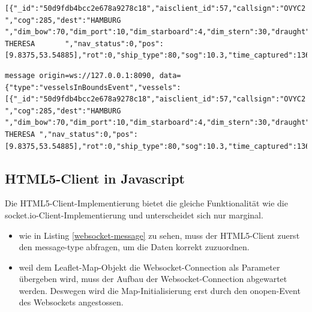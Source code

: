 \begin{lstlisting}[caption= vom socket.io-Server gesendete message, label=socket.io-message]
[{"_id":"50d9fdb4bcc2e678a9278c18","aisclient_id":57,"callsign":"OVYC2  ","cog":285,"dest":"HAMBURG             ","dim_bow":70,"dim_port":10,"dim_starboard":4,"dim_stern":30,"draught":54,"imo":"9363170","mmsi":220515000,"msgid":1,"name":"RIKKE THERESA       ","nav_status":0,"pos":[9.8375,53.54885],"rot":0,"ship_type":80,"sog":10.3,"time_captured":1366734056000,"time_received":1366733855248,"true_heading":286}]
\end{lstlisting}

\begin{lstlisting}[caption= vom Websocket-Server gesendete message, label=websocket-message]
message origin=ws://127.0.0.1:8090, data={"type":"vesselsInBoundsEvent","vessels":[{"_id":"50d9fdb4bcc2e678a9278c18","aisclient_id":57,"callsign":"OVYC2 ","cog":285,"dest":"HAMBURG ","dim_bow":70,"dim_port":10,"dim_starboard":4,"dim_stern":30,"draught":54,"imo":"9363170","mmsi":220515000,"msgid":1,"name":"RIKKE THERESA ","nav_status":0,"pos":[9.8375,53.54885],"rot":0,"ship_type":80,"sog":10.3,"time_captured":1366733896000,"time_received":1366733855248,"true_heading":286}]}

\end{lstlisting}

\subsection{HTML5-Client in Javascript}\label{HTML5-Client in Javascript}
Die HTML5-Client-Implementierung bietet die gleiche Funktionalität wie die socket.io-Client-Implementierung und unterscheidet sich nur marginal.
 \begin{itemize}
 \item wie in Listing \ref{websocket-message} zu sehen, muss der HTML5-Client zuerst den message-type abfragen, um die Daten korrekt zuzuordnen.
 \item weil dem Leaflet-Map-Objekt die Websocket-Connection als Parameter übergeben wird, muss der Aufbau der Websocket-Connection abgewartet werden. Deswegen wird die Map-Initialisierung erst durch den onopen-Event des Websockets angestossen.
\end{itemize}


